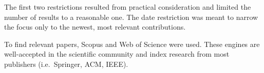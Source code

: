 The first two restrictions resulted from practical consideration and limited the number of results to a reasonable one.
The date restriction was meant to narrow the focus only to the newest, most relevant contributions.

To find relevant papers, Scopus and Web of Science were used.
These engines are well-accepted in the scientific community and index research from most publishers (i.e.\ Springer, ACM, IEEE).

